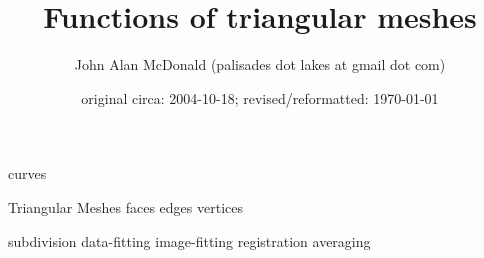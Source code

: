 \documentclass{PalisadesLakesReport}
\title{Functions of triangular meshes}
\author{John Alan McDonald (palisades dot lakes at gmail dot com)}
\date{original circa: 2004-10-18; revised/reformatted: \today}
\begin{document}
\maketitle
\PalisadesLakesTableOfContents
\def\sharedFolder{../../shared/}





{curves}
\begin{plSection}{Triangular Meshes}
{faces}
{edges}
{vertices}
\end{plSection}%
{subdivision}
{data-fitting}
{image-fitting}
{registration}
{averaging}

\end{document}
